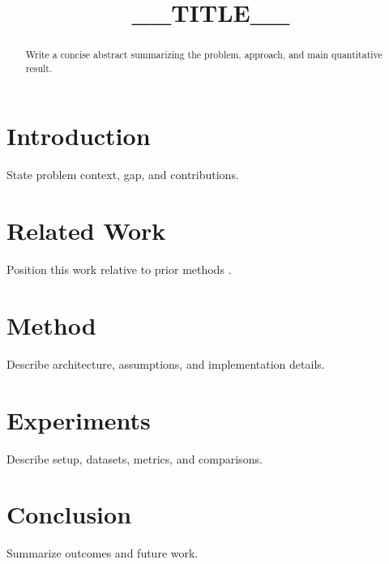 \documentclass[conference]{IEEEtran}
\title{__TITLE__}
\author{\IEEEauthorblockN{__AUTHOR__}}
\begin{document}
\maketitle

\begin{abstract}
Write a concise abstract summarizing the problem, approach, and main quantitative result.
\end{abstract}

\section{Introduction}
State problem context, gap, and contributions.

\section{Related Work}
Position this work relative to prior methods \cite{lamport1994}.

\section{Method}
Describe architecture, assumptions, and implementation details.

\section{Experiments}
Describe setup, datasets, metrics, and comparisons.

\section{Conclusion}
Summarize outcomes and future work.



\end{document}
